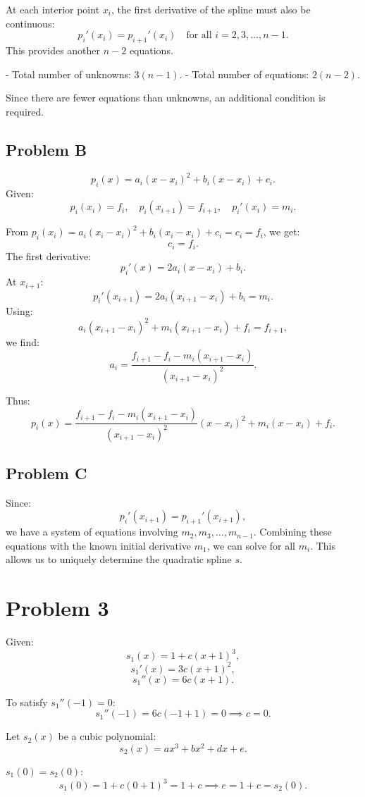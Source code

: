 \documentclass{article}
\begin{document}
At each interior point \( x_i \), the first derivative of the spline must also be continuous:
   \[
   p_i'(x_i) = p_{i+1}'(x_i) \quad \text{for all } i = 2, 3, \dots, n - 1.
   \]
   This provides another \( n - 2 \) equations.

- Total number of unknowns: \( 3(n - 1) \).
- Total number of equations: \( 2(n - 2) \).

Since there are fewer equations than unknowns, an additional condition is required.

\subsection{Problem B}
\[
p_i(x) = a_i (x - x_i)^2 + b_i (x - x_i) + c_i.
\]
Given:
\[
p_i(x_i) = f_i, \quad p_i(x_{i+1}) = f_{i+1}, \quad p_i'(x_i) = m_i.
\]

From \( p_i(x_i) = a_i (x_i - x_i)^2 + b_i (x_i - x_i) + c_i = c_i = f_i \), we get:
\[
c_i = f_i.
\]
The first derivative:
\[
p_i'(x) = 2a_i (x - x_i) + b_i.
\]
At \( x_{i+1} \):
\[
p_i'(x_{i+1}) = 2a_i (x_{i+1} - x_i) + b_i = m_i.
\]
Using:
\[
a_i (x_{i+1} - x_i)^2 + m_i (x_{i+1} - x_i) + f_i = f_{i+1},
\]
we find:
\[
a_i = \frac{f_{i+1} - f_i - m_i (x_{i+1} - x_i)}{(x_{i+1} - x_i)^2}.
\]

Thus:
\[
p_i(x) = \frac{f_{i+1} - f_i - m_i (x_{i+1} - x_i)}{(x_{i+1} - x_i)^2} (x - x_i)^2 + m_i (x - x_i) + f_i.
\]

\subsection{Problem C}
Since:
\[
p_i'(x_{i+1}) = p_{i+1}'(x_{i+1}),
\]
we have a system of equations involving \( m_2, m_3, \ldots, m_{n-1} \). Combining these equations with the known initial derivative \( m_1 \), we can solve for all \( m_i \). This allows us to uniquely determine the quadratic spline \( s \).



\section{Problem 3}
Given:
\[
s_1(x) = 1 + c (x + 1)^3,
\]
\[
s_1'(x) = 3c (x + 1)^2,
\]
\[
s_1''(x) = 6c (x + 1).
\]

To satisfy \( s_1''(-1) = 0 \):
\[
s_1''(-1) = 6c (-1 + 1) = 0 \implies c = 0.
\]

Let \( s_2(x) \) be a cubic polynomial:
\[
s_2(x) = a x^3 + b x^2 + d x + e.
\]

\( s_1(0) = s_2(0) \):
   \[
   s_1(0) = 1 + c (0 + 1)^3 = 1 + c \implies e = 1 + c = s_2(0).
   \]
\end{document}
